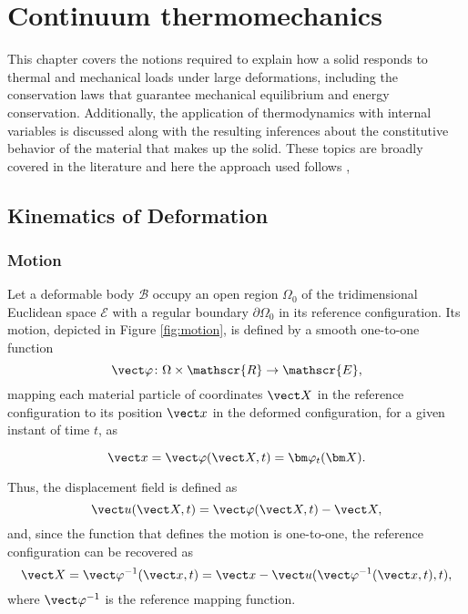 \chapter{Continuum thermomechanics} \label{ch:continuum_mechanics}

This chapter covers the notions required to explain how a solid responds to thermal and mechanical loads under large deformations, including the conservation laws that guarantee mechanical equilibrium and energy conservation.
Additionally, the application of thermodynamics with internal variables is discussed along with the resulting inferences about the constitutive behavior of the material that makes up the solid.
These topics are broadly covered in the literature and here the approach used follows \cite{de_souza_neto_computational_2008},

\section{Kinematics of Deformation}

\subsection{Motion}

Let a deformable body $\mathscr{B}$ occupy an open region $\Omega_0$ of the tridimensional Euclidean space $\mathscr{E}$ with a regular boundary $\partial \Omega_0$ in its reference configuration.
Its motion, depicted in Figure \ref{fig:motion}, is defined by a smooth one-to-one function
\begin{equation}
    \vect \varphi\colon \Omega\times \mathscr{R}\to \mathscr{E},
\end{equation}
mapping each material particle of coordinates $\vect X$ in the reference configuration to its position $\vect x$ in the deformed configuration, for a given instant of time $t$, as
\begin{highlight}
    \begin{equation}
        \vect x = \vect \varphi(\vect X, t)=\bm \varphi_t(\bm X).
    \end{equation}
\end{highlight}

\enlargethispage{\baselineskip}
Thus, the displacement field is defined as
\begin{equation}
    \vect u(\vect X, t) = \vect \varphi(\vect X, t) - \vect X,
\end{equation}
and, since the function that defines the motion is one-to-one, the reference configuration can be recovered as
\begin{equation}
    \vect X = \vect \varphi^{-1} (\vect x, t) = \vect x - \vect u(\vect \varphi^{-1}(\vect x, t),t),
\end{equation}
where $\vect \varphi^{-1}$ is the reference mapping function.

